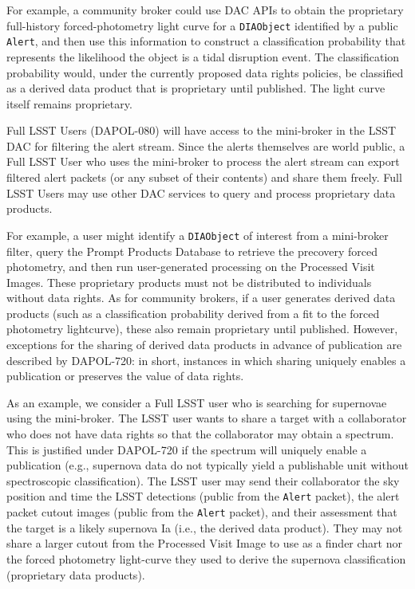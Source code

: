 For example, a community broker could use DAC APIs to obtain the proprietary full-history forced-photometry light curve for a \texttt{DIAObject} identified by a public {\tt Alert},
and then use this information to construct a classification probability that represents the likelihood the object is a tidal disruption event.
The classification probability would, under the currently proposed data rights policies, be classified as a derived data product that is proprietary until published. The light curve itself remains proprietary.

Full LSST Users (DAPOL-080) will have access to the mini-broker in the LSST DAC for filtering the alert stream.
Since the alerts themselves are world public, a Full LSST User who uses the mini-broker to process the alert stream can export filtered alert packets (or any subset of their contents) and share them freely.
Full LSST Users may use other DAC services to query and process proprietary data products.

For example, a user might identify a \texttt{DIAObject} of interest from a mini-broker filter, query the Prompt Products Database to retrieve the precovery forced photometry, and then run user-generated processing on the Processed Visit Images.
These proprietary products must not be distributed to individuals without data rights.
As for community brokers, if a user generates derived data products (such as a classification probability derived from a fit to the forced photometry lightcurve), these also remain proprietary until published.
However, exceptions for the sharing of derived data products in advance of publication are described by DAPOL-720: in short, instances in which sharing uniquely enables a publication or preserves the value of data rights.

As an example, we consider a Full LSST user who is searching for supernovae using the mini-broker.
The LSST user wants to share a target with a collaborator who does not have data rights so that the collaborator may obtain a spectrum.
This is justified under DAPOL-720 if the spectrum will uniquely enable a publication (e.g., supernova data do not typically yield a publishable unit without spectroscopic classification).
The LSST user may send their collaborator the sky position and time the LSST detections (public from the \texttt{Alert} packet), the alert packet cutout images (public from the \texttt{Alert} packet), and their assessment that the target is a likely supernova Ia (i.e., the derived data product).
They may not share a larger cutout from the Processed Visit Image to use as a finder chart nor the forced photometry light-curve they used to derive the supernova classification (proprietary data products).

